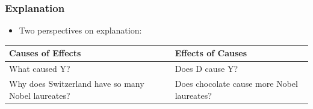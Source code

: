 \documentclass[xcolor=x11names,compress]{beamer}\usepackage[]{graphicx}\usepackage[]{color}
\renewcommand{\(}{\begin{columns}}
\renewcommand{\)}{\end{columns}}
\newcommand{\<}[1]{\begin{column}{#1}}
\renewcommand{\>}{\end{column}}
\begin{document}
\begin{frame}
\frametitle{Explanation}
\begin{itemize}
\item Two perspectives on explanation:
\end{itemize}
\pause
\begin{table}[htbp]
  \centering
    \begin{tabular}{|>{\raggedright}p{5cm}|p{5cm}|}
    \toprule
    \textbf{Causes of Effects} & \textbf{Effects of Causes} \\
    \midrule
    What caused Y? & Does D cause Y? \\
    \midrule
    Why does Switzerland have so many Nobel laureates? & Does chocolate cause more Nobel laureates? \\
    \bottomrule
    \end{tabular}%
  \label{tab:addlabel}%
\end{table}%
\end{frame}
\end{document}
